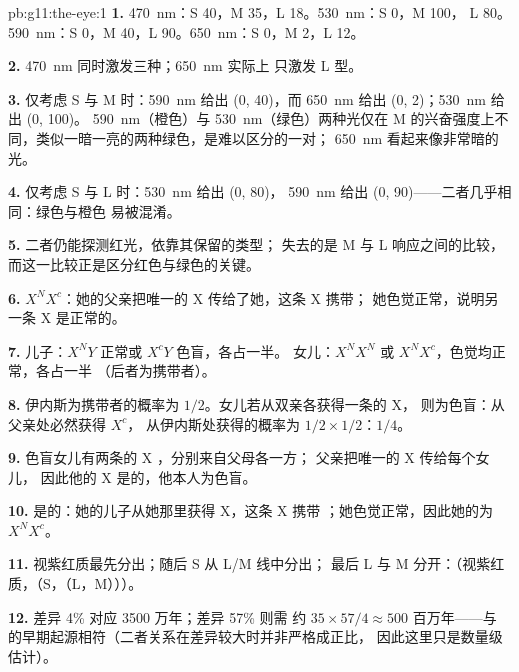 \begin{solution}{pb:g11:the-eye:1}
\textbf{1.} \qty{470}{nm}：S 40，M 35，L 18。\qty{530}{nm}：S 0，M 100，
L 80。\qty{590}{nm}：S 0，M 40，L 90。\qty{650}{nm}：S 0，M 2，L 12。

\textbf{2.} \qty{470}{nm} 同时激发三种；\qty{650}{nm} 实际上
只激发 L 型。

\textbf{3.} 仅考虑 S 与 M 时：\qty{590}{nm} 给出 (0, 40)，而
\qty{650}{nm} 给出 (0, 2)；\qty{530}{nm} 给出 (0, 100)。
\qty{590}{nm}（橙色）与 \qty{530}{nm}（绿色）两种光仅在
M 的兴奋强度上不同，类似一暗一亮的两种绿色，是难以区分的一对；
\qty{650}{nm} 看起来像非常暗的光。

\textbf{4.} 仅考虑 S 与 L 时：\qty{530}{nm} 给出 (0, 80)，
\qty{590}{nm} 给出 (0, 90)——二者几乎相同：绿色与橙色
易被混淆。

\textbf{5.} 二者仍能探测红光，依靠其保留的类型；
失去的是 M 与 L 响应之间的比较，
而这一比较正是区分红色与绿色的关键。

\textbf{6.} $X^NX^c$：她的父亲把唯一的 X 传给了她，这条 X 携带；
她色觉正常，说明另一条 X 是正常的。

\textbf{7.} 儿子：$X^NY$ 正常或 $X^cY$ 色盲，各占一半。
女儿：$X^NX^N$ 或 $X^NX^c$，色觉均正常，各占一半
（后者为携带者）。

\textbf{8.} 伊内斯为携带者的概率为 $1/2$。女儿若从双亲各获得一条的 X，
则为色盲：从父亲处必然获得 $X^c$，
从伊内斯处获得的概率为 $1/2 \times 1/2$：$1/4$。

\textbf{9.} 色盲女儿有两条的 X ，分别来自父母各一方；
父亲把唯一的 X 传给每个女儿，
因此他的 X 是的，他本人为色盲。

\textbf{10.} 是的：她的儿子从她那里获得 X，这条 X 携带
；她色觉正常，因此她的为 $X^NX^c$。

\textbf{11.} 视紫红质最先分出；随后 S 从 L/M 线中分出；
最后 L 与 M 分开：（视紫红质，（S，（L，M）））。

\textbf{12.} 差异 4\% 对应 3500 万年；差异 57\% 则需
约 $35 \times 57/4 \approx 500$ 百万年——与
的早期起源相符（二者关系在差异较大时并非严格成正比，
因此这里只是数量级估计）。


\end{solution}
